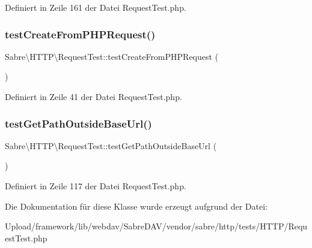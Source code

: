 Definiert in Zeile 161 der Datei Request\+Test.\+php.

\mbox{\label{class_sabre_1_1_h_t_t_p_1_1_request_test_a0ad019136156ca302eda7109bbaf3722}} 
\subsubsection{\texorpdfstring{test\+Create\+From\+P\+H\+P\+Request()}{testCreateFromPHPRequest()}}
{\footnotesize\ttfamily Sabre\textbackslash{}\+H\+T\+T\+P\textbackslash{}\+Request\+Test\+::test\+Create\+From\+P\+H\+P\+Request (\begin{DoxyParamCaption}{ }\end{DoxyParamCaption})}



Definiert in Zeile 41 der Datei Request\+Test.\+php.

\mbox{\label{class_sabre_1_1_h_t_t_p_1_1_request_test_a8eba0fc804c7e6b462b723cd294f8c9e}} 
\subsubsection{\texorpdfstring{test\+Get\+Path\+Outside\+Base\+Url()}{testGetPathOutsideBaseUrl()}}
{\footnotesize\ttfamily Sabre\textbackslash{}\+H\+T\+T\+P\textbackslash{}\+Request\+Test\+::test\+Get\+Path\+Outside\+Base\+Url (\begin{DoxyParamCaption}{ }\end{DoxyParamCaption})}



Definiert in Zeile 117 der Datei Request\+Test.\+php.



Die Dokumentation für diese Klasse wurde erzeugt aufgrund der Datei\+:\begin{DoxyCompactItemize}
\item 
Upload/framework/lib/webdav/\+Sabre\+D\+A\+V/vendor/sabre/http/tests/\+H\+T\+T\+P/Request\+Test.\+php\end{DoxyCompactItemize}

